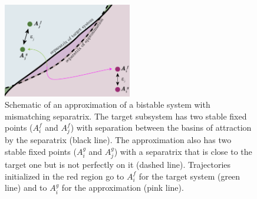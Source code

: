 \documentclass{article}
\theoremstyle{definition} \newtheorem{definition}{Definition}
\theoremstyle{remark} \newtheorem{remark}{Remark}
\newcounter{ct}
\begin{document}
\setlength\belowcaptionskip{-1ex}
\begin{figure}
  \centering
  \includegraphics[width=0.5\textwidth]{separatrices}
  \caption{
	Schematic of an approximation of a bistable system with mismatching separatrix. %
	The target subsystem has two stable fixed points ($A_i^f$ and $A_j^f$) with separation between the basins of attraction by the separatrix (black line).
	The approximation also has two stable fixed points ($A_i^g$ and $A_j^g$) with a separatrix that is close to the target one but is not perfectly on it (dashed line).
	Trajectories initialized in the red region go to $A_i^f$ for the target system (green line) and to $A_i^g$ for the approximation (pink line). %
  }\label{fig:separatrices}
\end{figure}
\end{document}
